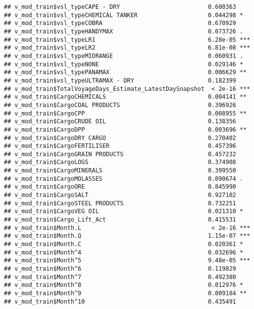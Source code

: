 \documentclass[]{article}
\begin{document}
\begin{verbatim}
## v_mod_train$vsl_typeCAPE - DRY                         0.600363    
## v_mod_train$vsl_typeCHEMICAL TANKER                    0.044298 *  
## v_mod_train$vsl_typeCOBRA                              0.670929    
## v_mod_train$vsl_typeHANDYMAX                           0.073726 .  
## v_mod_train$vsl_typeLR1                                6.28e-05 ***
## v_mod_train$vsl_typeLR2                                6.81e-08 ***
## v_mod_train$vsl_typeMIDRANGE                           0.060931 .  
## v_mod_train$vsl_typeNONE                               0.029146 *  
## v_mod_train$vsl_typePANAMAX                            0.006629 ** 
## v_mod_train$vsl_typeULTRAMAX - DRY                     0.182399    
## v_mod_train$TotalVoyageDays_Estimate_LatestDaySnapshot  < 2e-16 ***
## v_mod_train$CargoCHEMICALS                             0.004141 ** 
## v_mod_train$CargoCOAL PRODUCTS                         0.396926    
## v_mod_train$CargoCPP                                   0.008955 ** 
## v_mod_train$CargoCRUDE OIL                             0.138356    
## v_mod_train$CargoDPP                                   0.003696 ** 
## v_mod_train$CargoDRY CARGO                             0.270402    
## v_mod_train$CargoFERTILISER                            0.457396    
## v_mod_train$CargoGRAIN PRODUCTS                        0.457232    
## v_mod_train$CargoLOGS                                  0.374908    
## v_mod_train$CargoMINERALS                              0.399550    
## v_mod_train$CargoMOLASSES                              0.090674 .  
## v_mod_train$CargoORE                                   0.845990    
## v_mod_train$CargoSALT                                  0.927102    
## v_mod_train$CargoSTEEL PRODUCTS                        0.732251    
## v_mod_train$CargoVEG OIL                               0.021310 *  
## v_mod_train$Cargo_Lift_Act                             0.415531    
## v_mod_train$Month.L                                     < 2e-16 ***
## v_mod_train$Month.Q                                    1.15e-07 ***
## v_mod_train$Month.C                                    0.020361 *  
## v_mod_train$Month^4                                    0.032696 *  
## v_mod_train$Month^5                                    9.48e-05 ***
## v_mod_train$Month^6                                    0.119829    
## v_mod_train$Month^7                                    0.492380    
## v_mod_train$Month^8                                    0.012976 *  
## v_mod_train$Month^9                                    0.009184 ** 
## v_mod_train$Month^10                                   0.435491    

\end{verbatim}
\end{document}

